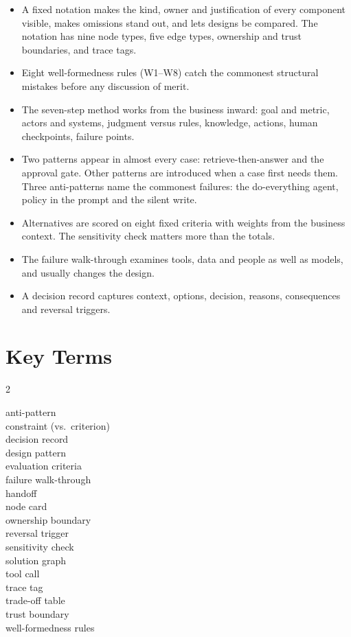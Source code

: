 \begin{itemize}[itemsep=2pt]
  \item A fixed notation makes the kind, owner and justification of every component visible, makes omissions stand out, and lets designs be compared. The notation has nine node types, five edge types, ownership and trust boundaries, and trace tags.
  \item Eight well-formedness rules (W1--W8) catch the commonest structural mistakes before any discussion of merit.
  \item The seven-step method works from the business inward: goal and metric, actors and systems, judgment versus rules, knowledge, actions, human checkpoints, failure points.
  \item Two patterns appear in almost every case: retrieve-then-answer and the approval gate. Other patterns are introduced when a case first needs them. Three anti-patterns name the commonest failures: the do-everything agent, policy in the prompt and the silent write.
  \item Alternatives are scored on eight fixed criteria with weights from the business context. The sensitivity check matters more than the totals.
  \item The failure walk-through examines tools, data and people as well as models, and usually changes the design.
  \item A decision record captures context, options, decision, reasons, consequences and reversal triggers.
\end{itemize}

\section*{Key Terms}

\begin{multicols}{2}
\raggedright\small
anti-pattern \\
constraint (vs.\ criterion) \\
decision record \\
design pattern \\
evaluation criteria \\
failure walk-through \\
handoff \\
node card \\
ownership boundary \\
reversal trigger \\
sensitivity check \\
solution graph \\
tool call \\
trace tag \\
trade-off table \\
trust boundary \\
well-formedness rules
\end{multicols}

